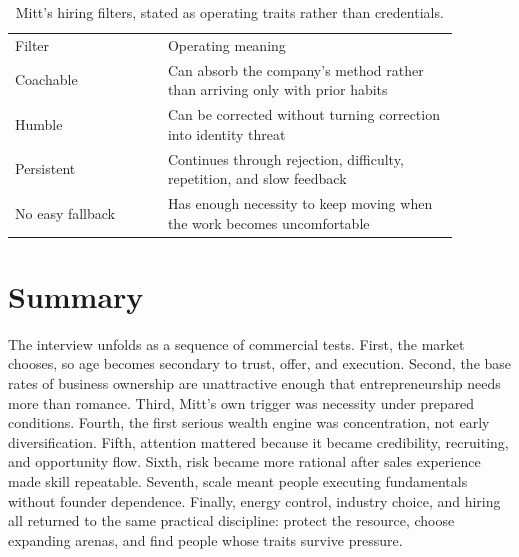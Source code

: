 \begin{table}
\centering
\begin{tabular}{p{0.30\linewidth}p{0.58\linewidth}}
Filter & Operating meaning \\
Coachable & Can absorb the company's method rather than arriving only with prior habits \\
Humble & Can be corrected without turning correction into identity threat \\
Persistent & Continues through rejection, difficulty, repetition, and slow feedback \\
No easy fallback & Has enough necessity to keep moving when the work becomes uncomfortable \\
\end{tabular}
\caption{Mitt's hiring filters, stated as operating traits rather than credentials.}
\end{table}

\section{Summary}

The interview unfolds as a sequence of commercial tests. First, the market chooses, so age becomes secondary to trust, offer, and execution. Second, the base rates of business ownership are unattractive enough that entrepreneurship needs more than romance. Third, Mitt's own trigger was necessity under prepared conditions. Fourth, the first serious wealth engine was concentration, not early diversification. Fifth, attention mattered because it became credibility, recruiting, and opportunity flow. Sixth, risk became more rational after sales experience made skill repeatable. Seventh, scale meant people executing fundamentals without founder dependence. Finally, energy control, industry choice, and hiring all returned to the same practical discipline: protect the resource, choose expanding arenas, and find people whose traits survive pressure.